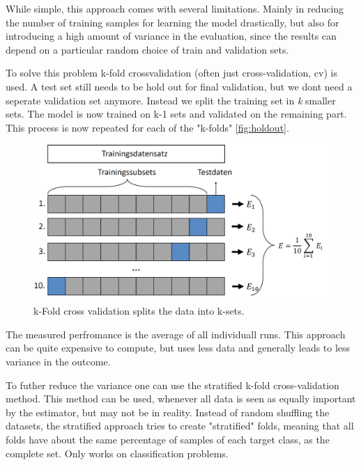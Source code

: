 \begin{questions}
While simple, this approach comes with several limitations. Mainly in reducing the number of training samples for learning the model drastically, but also for introducing a high amount of variance in the evaluation, since the results can depend on a particular random choice of train and validation sets. 

To solve this problem k-fold crossvalidation (often just cross-validation, cv) is used. A test set still needs to be hold out for final validation, but we dont need a seperate validation set anymore. Instead we split the training set in \textit{k} smaller sets. The model is now trained on k-1 sets and validated on the remaining part. This process is now repeated for each of the "k-folds" \ref{fig:holdout}.

\begin{figure}[H]
	\includegraphics[width=0.7\linewidth]{pictures/cross_validation.png}
	\centering
	\caption{k-Fold cross validation splits the data into k-sets.}
	\label{fig:cv}
\end{figure}

The measured perfromance is the average of all individuall runs. This approach can be quite expensive to compute, but uses less data and generally leads to less variance in the outcome. 

To futher reduce the variance one can use the stratified k-fold cross-validation method. This method can be used, whenever all data is seen as equally important by the estimator, but may not be in reality. Instead of random shuffling the datasets, the stratified approach tries to create "stratified" folds, meaning that all folds have about the same percentage of samples of each target class, as the complete set. Only works on classification problems. 


\end{questions}
